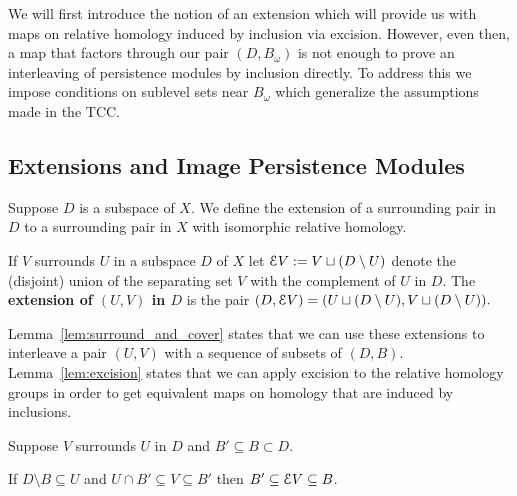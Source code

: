 We will first introduce the notion of an extension which will provide us with maps on relative homology induced by inclusion via excision.
However, even then, a map that factors through our pair $(D, B_\omega)$ is not enough to prove an interleaving of persistence modules by inclusion directly.
To address this we impose conditions on sublevel sets near $B_\omega$ which generalize the assumptions made in the TCC.

\subsection{Extensions and Image Persistence Modules}

Suppose $D$ is a subspace of $X$.
We define the extension of a surrounding pair in $D$ to a surrounding pair in $X$ with isomorphic relative homology.

\begin{definition}[Extension]
  If $V$ surrounds $U$ in a subspace $D$ of $X$ let $\mathcal{E} V := V\sqcup (D\setminus U)$ denote the (disjoint) union of the separating set $V$ with the complement of $U$ in $D$.
  The \textbf{extension of $(U, V)$ in $D$} is the pair $(D, \mathcal{E} V) = (U\sqcup (D\setminus U), V\sqcup (D\setminus U)).$
\end{definition}

Lemma~\ref{lem:surround_and_cover} states that we can use these extensions to interleave a pair $(U, V)$ with a sequence of subsets of $(D, B)$.
Lemma~\ref{lem:excision} states that we can apply excision to the relative homology groups in order to get equivalent maps on homology that are induced by inclusions.

\begin{lemma}\label{lem:surround_and_cover}
  Suppose $V$ surrounds $U$ in $D$ and $B'\subseteq B\subset D$.

  If $D\setminus B\subseteq U$ and $U\cap B'\subseteq V\subseteq B'$ then $B'\subseteq \mathcal{E} V\subseteq B$.
\end{lemma}

